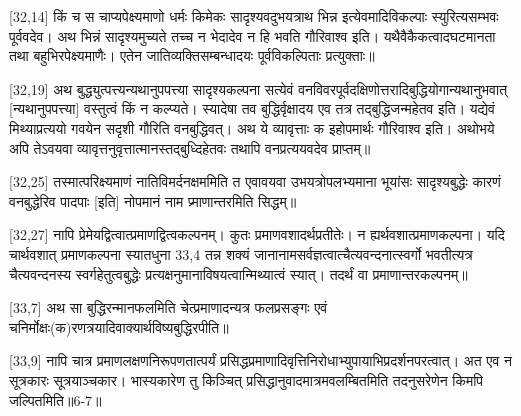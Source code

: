 [32,14] किं च स चाप्यपेक्ष्यमाणो धर्मः किमेकः सादृश्यवदुभयत्राथ भिन्न इत्येवमादिविकल्पाः स्युरित्यसम्भवः पूर्ववदेव। अथ भिन्नं सादृश्यमुच्यते तच्च न भेदादेव न हि भवति गौरिवाश्व इति। यथैवैकैकत्वादघटमानता तथा बहुभिरपेक्ष्यमाणैः। एतेन जातिव्यक्तिसम्बन्धादयः पूर्वविकल्पिताः
प्रत्युक्ताः॥

[32,19] अथ बुद्ध्युत्पत्त्यन्यथानुपपत्त्या सादृश्यकल्पना सत्येवं वनविवरपूर्वदक्षिणोत्तरादिबुद्धियोगान्यथानुभवात् [न्यथानुपपत्त्या] वस्तुत्वं किं न कल्प्यते। स्यादेषा तव बुद्धिर्वृक्षादय एव तत्र तद्बुद्धिजन्महेतव इति। यद्येवं मिथ्याप्रत्ययो गवयेन सदृशी गौरिति वनबुद्धिवत्। अथ ये व्यावृत्ताः क इहोपमार्थः गौरिवाश्व इति। अथोभये अपि तेऽवयवा व्यावृत्तनुवृत्तात्मानस्तद्बुध्दिहेतवः तथापि वनप्रत्ययवदेव
प्राप्तम्॥

[32,25] तस्मात्परिक्ष्यमाणं नातिविमर्दनक्षममिति त एवावयवा उभयत्रोपलभ्यमाना भूयांसः सादृश्यबुद्धेः कारणं वनबुद्धेरिव
पादपाः [इति] नोपमानं नाम प्र्माणान्तरमिति सिद्धम्॥

[32,27] नापि प्रेमेयद्वित्वात्प्रमाणद्वित्वकल्पनम्। कुतः प्रमाणवशादर्थप्रतीतेः। न ह्यर्थवशात्प्रमाणकल्पना। यदि चार्थवशात्%
प्रमाणकल्पना स्यातधुना 33,4       तन्न शक्यं जानानामसर्वज्ञत्वात्चैत्यवन्दनात्स्वर्गो भवतीत्यत्र चैत्यवन्दनस्य स्वर्गहेतुत्वबुद्धेः प्रत्यक्षनुमानाविषयत्वान्मिथ्यात्वं स्यात्। तदर्थं वा प्रमाणान्तरकल्पनम्॥

[33,7] अथ सा बुद्धिरन्मानफलमिति चेत्प्रमाणादन्यत्र
फलप्रसङ्गः एवं चनिर्मोक्षः(क)रणत्रयादिवाक्यार्थविष्यबुद्धिरपीति॥

[33,9] नापि चात्र प्रमाणलक्षणनिरूपणतात्पर्यं
प्रसिद्धप्रमाणादिवृत्तिनिरोधाभ्युपायाभिप्रदर्शनपरत्वात्। अत एव न सूत्रकारः सूत्रयाञ्चकार। भास्यकारेण तु किञ्चित्%
प्रसिद्धानुवादमात्रमवलम्बितमिति तदनुसरेणेन किमपि जल्पितमिति॥6-7॥
